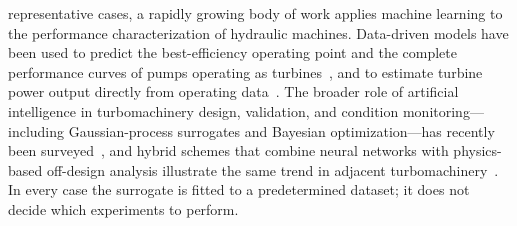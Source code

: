 \documentclass[preprint,12pt]{elsarticle}
\begin{document}
representative cases, a rapidly growing body of work applies machine learning to the
performance characterization of hydraulic machines. Data-driven models have been used
to predict the best-efficiency operating point and the complete performance curves of
pumps operating as turbines~\cite{telikani2023pat,yu2024pat}, and to estimate turbine
power output directly from operating data~\cite{malakouti2023turbinepower}. The
broader role of artificial intelligence in turbomachinery design, validation, and
condition monitoring---including Gaussian-process surrogates and Bayesian
optimization---has recently been surveyed~\cite{zou2024aiturbomachinery}, and hybrid
schemes that combine neural networks with physics-based off-design analysis
illustrate the same trend in adjacent turbomachinery~\cite{talebi2022microgt}. In
every case the surrogate is fitted to a predetermined dataset; it does not decide
which experiments to perform.
\end{document}
